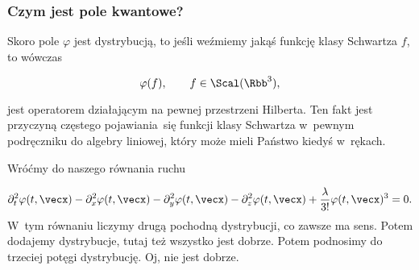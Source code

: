 \documentclass[10pt,t]{beamer}
\begin{document}
\begin{frame}
  \frametitle{Czym jest pole kwantowe?}


  Skoro pole $\varphi$ jest dystrybucją, to jeśli weźmiemy jakąś funkcję
  klasy Schwartza $f$, to wówczas

  \vspace{-1.7em}



  \begin{equation}
    \label{eq:Niespodziewane-teoretyczne-03}
    \varphi( f ), \qquad
    f \in \Scal( \Rbb^{ 3 } ),
  \end{equation}

  \vspace{-1.8em}



  jest operatorem działającym na pewnej przestrzeni Hilberta. Ten fakt
  jest przyczyną częstego pojawiania~się funkcji klasy Schwartza w~pewnym
  podręczniku do algebry liniowej, który może mieli Państwo kiedyś w~rękach.

  Wróćmy do naszego równania ruchu

  \vspace{-2em}



  \begin{equation}
    \label{eq:Niespodziewane-teoretyczne-01}
    \begin{split}
      \partial_{ t }^{ 2 } \varphi( t, \vecx ) - \partial_{ x }^{ 2 } \varphi( t, \vecx ) -
      \partial_{ y }^{ 2 } \varphi( t, \vecx ) - \partial_{ z }^{ 2 } \varphi( t, \vecx ) +
      \frac{ \lambda }{ 3! } \varphi( t, \vecx )^{ 3 } = 0.
    \end{split}
  \end{equation}
  W~tym równaniu liczymy drugą pochodną dystrybucji, co zawsze ma sens.
  Potem dodajemy dystrybucje, tutaj też wszystko jest dobrze. Potem
  podnosimy do \alert{trzeciej potęgi} dystrybucję. Oj, nie jest dobrze.

\end{frame}
\end{document}
